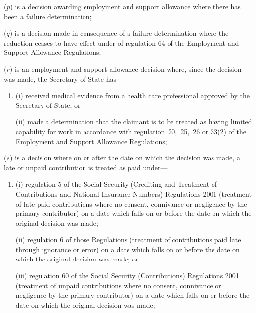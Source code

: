 \documentclass[12pt,a4paper]{article}
\begin{document}
\begin{enumerate}
($p$) is a decision awarding employment and support allowance where there has been a failure determination;

($q$) is a decision made in consequence of a failure determination where the reduction ceases to have effect under of regulation 64 of the Employment and Support Allowance Regulations;


($r$) is an employment and support allowance decision where, since the decision was made, the Secretary of State has—
\begin{enumerate}\item[]
(i) received medical evidence from a health care professional approved by the Secretary of State, or

(ii) made a determination that the claimant is to be treated as having limited capability for work in accordance with regulation~20,~25,~26 or 33(2) of the Employment and Support Allowance Regulations;
\end{enumerate}

($s$) is a decision where on or after the date on which the decision was made, a late or unpaid contribution is treated as paid under—
\begin{enumerate}\item[]
(i) regulation 5 of the Social Security (Crediting and Treatment of Contributions and National Insurance Numbers) Regulations 2001 (treatment of late paid contributions where no consent, connivance or negligence by the primary contributor) on a date which falls on or before the date on which the original decision was made;

(ii) regulation 6 of those Regulations (treatment of contributions paid late through ignorance or error) on a date which falls on or before the date on which the original decision was made; or

(iii) regulation 60 of the Social Security (Contributions) Regulations 2001 (treatment of unpaid contributions where no consent, connivance or negligence by the primary contributor) on a date which falls on or before the date on which the original decision was made;
\end{enumerate}


\end{enumerate}
\end{document}
